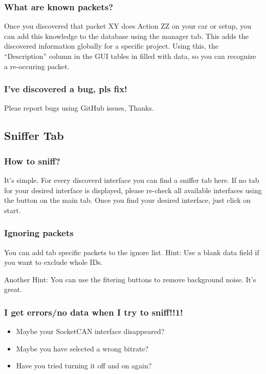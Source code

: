 \documentclass[letterpaper,10pt,english]{sphinxmanual}
\begin{document}
\subsubsection{What are known packets?}
\label{\detokenize{manual.general:what-are-known-packets}}
Once you discovered that packet XY does Action ZZ on your car or
setup, you can add this knowledge to the database using the manager tab.
This adds the discovered information globally for a specific project.
Using this, the “Description” column in the GUI tables in filled with
data, so you can recognize a re-occuring packet.


\subsubsection{I’ve discovered a bug, pls fix!}
\label{\detokenize{manual.general:i-ve-discovered-a-bug-pls-fix}}
Pleae report bugs using GitHub issues, Thanks.


\subsection{Sniffer Tab}
\label{\detokenize{manual.sniffertab:sniffer-tab}}\label{\detokenize{manual.sniffertab::doc}}

\subsubsection{How to sniff?}
\label{\detokenize{manual.sniffertab:how-to-sniff}}
It’s simple. For every discoverd interface you can find a sniffer tab
here. If no tab for your desired interface is displayed, please
re-check all available interfaces using the button on the main tab.
Once you find your desired interface, just click on start.


\subsubsection{Ignoring packets}
\label{\detokenize{manual.sniffertab:ignoring-packets}}
You can add tab specific packets to the ignore list.
Hint: Use a blank data field if you want to exclude whole IDs.

Another Hint: You can use the fitering buttons to remove background noise. It’s great.


\subsubsection{I get errors/no data when I try to sniff!!1!}
\label{\detokenize{manual.sniffertab:i-get-errors-no-data-when-i-try-to-sniff-1}}\begin{itemize}
\item {} 
Maybe your SocketCAN interface disappeared?

\item {} 
Maybe you have selected a wrong bitrate?

\item {} 
Have you tried turning it off and on again?

\end{itemize}
\end{document}
